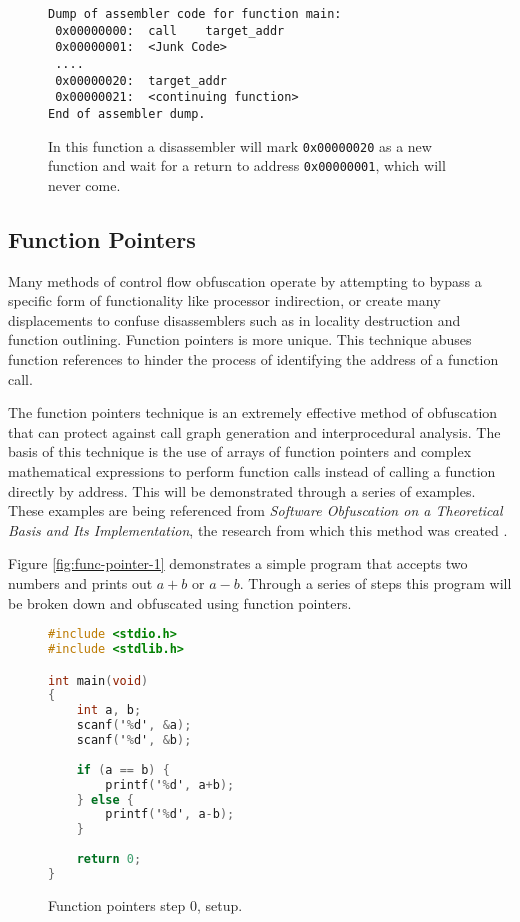 \documentclass[conference]{IEEEtran}
\begin{document}
\begin{figure}[h]
\begin{lstlisting}[basicstyle=\footnotesize]
Dump of assembler code for function main:
 0x00000000:  call    target_addr
 0x00000001:  <Junk Code>
 ....
 0x00000020:  target_addr
 0x00000021:  <continuing function>
End of assembler dump.
\end{lstlisting}
\caption{In this function a disassembler will mark \texttt{0x00000020} as a new function and wait for a return to address \texttt{0x00000001}, which will never come.}
\label{fig:call-ret-example}
\end{figure}

\subsection{Function Pointers}
\label{sec:function-pointers}
Many methods of control flow obfuscation operate by attempting to bypass a specific form of functionality like processor indirection, or create many displacements to confuse disassemblers such as in locality destruction and function outlining. Function pointers is more unique. This technique abuses function references to hinder the process of identifying the address of a function call.

The function pointers technique is an extremely effective method of obfuscation that can protect against call graph generation and interprocedural analysis. The basis of this technique is the use of arrays of function pointers and complex mathematical expressions to perform function calls instead of calling a function directly by address. This will be demonstrated through a series of examples. These examples are being referenced from \textit{Software Obfuscation on a Theoretical Basis and Its Implementation}, the research from which this method was created \cite{b4}.

Figure \ref{fig:func-pointer-1} demonstrates a simple program that accepts two numbers and prints out \(a+b\) or \(a-b\). Through a series of steps this program will be broken down and obfuscated using function pointers.

\begin{figure}[h]
\begin{lstlisting}[language=C,basicstyle=\footnotesize]
#include <stdio.h>
#include <stdlib.h> 

int main(void)
{
	int a, b;
	scanf('%d', &a);
	scanf('%d', &b);
	
	if (a == b) {
	    printf('%d', a+b);
	} else {
	    printf('%d', a-b);
	}
	
	return 0;
}
\end{lstlisting}
\caption{Function pointers step 0, setup.}
\label{fig:func-pointer-0}
\end{figure}
\end{document}
